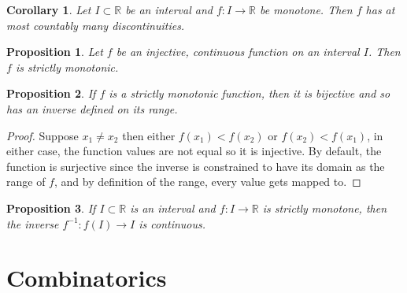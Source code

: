 \documentclass{article}
\newtheorem{corollary}{Corollary}[section]
\newtheorem{proposition}{Proposition}[section]
\theoremstyle{definition}
\theoremstyle{remark}
\begin{document}
\vspace{.5cm}


\begin{corollary}
Let $I \subset \mathbb{R}$ be an interval and $f : I \to \mathbb{R}$ be monotone. Then $f$ has at most countably many discontinuities.
\end{corollary}


\vspace{.5cm}



\begin{proposition}
Let $f$ be an injective, continuous function on an interval $I$. Then 
$f$ is strictly monotonic. 
\end{proposition}






\vspace{.5cm}



\begin{proposition}
If $f$ is a strictly monotonic function, then it is bijective and so has an inverse defined on its range.
\end{proposition}

\begin{proof}
Suppose $x_1 \neq x_2$ then either $f(x_1) < f(x_2)$ or $f(x_2) < f(x_1)$, in either case,
the function values are not equal so it is injective. By default, the function is surjective since the inverse 
is constrained to have its domain as the range of $f$, and by definition of the range, every value gets mapped to.
\end{proof}







\begin{proposition}
If $I \subset \mathbb{R}$ is an interval and $f : I \to \mathbb{R}$ is strictly monotone, then the inverse $f^{-1} : f(I) \to I$ is continuous.
\end{proposition}

















\section{Combinatorics}
\end{document}
